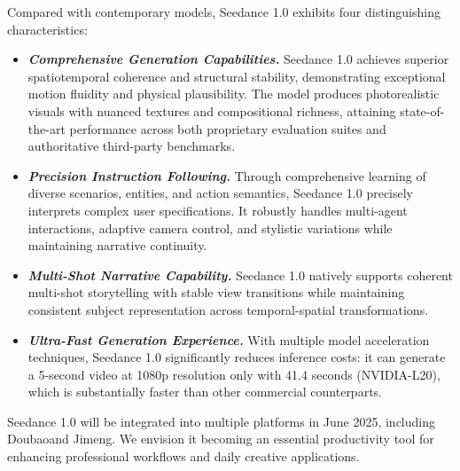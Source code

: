 Compared with contemporary models, Seedance 1.0 exhibits four distinguishing characteristics:

\begin{itemize}[leftmargin=*]

\item \textbf{\textit{Comprehensive Generation Capabilities.}}
Seedance 1.0 achieves superior spatiotemporal coherence and structural stability, demonstrating exceptional motion fluidity and physical plausibility. The model produces photorealistic visuals with nuanced textures and compositional richness, attaining state-of-the-art performance across both proprietary evaluation suites and authoritative third-party benchmarks.


\item \textbf{\textit{Precision Instruction Following.}}
Through comprehensive learning of diverse scenarios, entities, and action semantics, Seedance 1.0 precisely interprets complex user specifications. It robustly handles multi-agent interactions, adaptive camera control, and stylistic variations while maintaining narrative continuity.



\item \textbf{\textit{Multi-Shot Narrative Capability.}} Seedance 1.0 natively supports coherent multi-shot storytelling with stable view transitions while maintaining consistent subject representation across temporal-spatial transformations.


\item \textbf{\textit{Ultra-Fast Generation Experience.}} With multiple model acceleration techniques, Seedance 1.0 significantly reduces inference costs: it can generate a 5-second video at 1080p resolution only with 41.4 seconds (NVIDIA-L20), which is substantially faster than other commercial counterparts.


\end{itemize} 
Seedance 1.0 will be integrated into multiple platforms in June 2025, including Doubao\footnotemark[1] and Jimeng\footnotemark[2]. We envision it becoming an essential productivity tool for enhancing professional workflows and daily creative applications.






